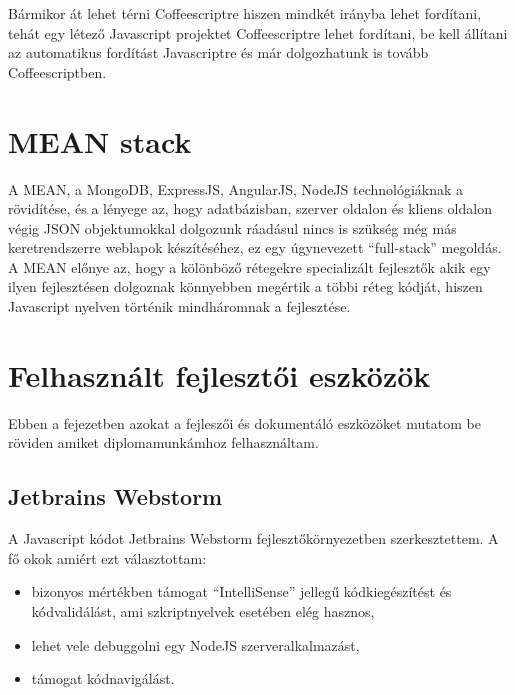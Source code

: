 Bármikor át lehet térni Coffeescriptre hiszen mindkét irányba lehet fordítani, tehát egy létező Javascript projektet Coffeescriptre lehet fordítani, be kell állítani az automatikus fordítást Javascriptre és már dolgozhatunk is tovább Coffeescriptben.















\section{MEAN stack}


A MEAN, a MongoDB, ExpressJS, AngularJS, NodeJS technológiáknak a rövidítése, és a lényege az, hogy adatbázisban, szerver oldalon és kliens oldalon végig JSON objektumokkal dolgozunk ráadásul nincs is szükség még más keretrendszerre weblapok készítéséhez, ez egy úgynevezett ``full-stack'' megoldás. A MEAN előnye az, hogy a kölönböző rétegekre specializált fejlesztők akik egy ilyen fejlesztésen dolgoznak könnyebben megértik a többi réteg kódját, hiszen Javascript nyelven történik mindháromnak a fejlesztése. 


\section{Felhasznált fejlesztői eszközök}

Ebben a fejezetben azokat a fejleszői és dokumentáló eszközöket mutatom be röviden amiket diplomamunkámhoz felhasználtam.

\subsection{Jetbrains Webstorm}

A Javascript kódot Jetbrains Webstorm fejlesztőkörnyezetben szerkesztettem. A fő okok amiért ezt választottam:
\begin{itemize}
\item bizonyos mértékben támogat ``IntelliSense'' jellegű kódkiegészítést és kódvalidálást, ami szkriptnyelvek esetében elég hasznos,
\item lehet vele debuggolni egy NodeJS szerveralkalmazást,
\item támogat kódnavigálást.

\end{itemize}

